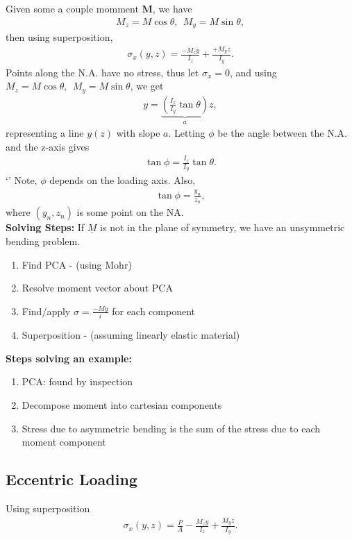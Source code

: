 \documentclass{article}
\numberwithin{equation}{subsection}
\newcommand{\bb}[1]{\mathbf{#1}}
\begin{document}
Given some a couple momment $\bb{M}$, we have
\begin{align*}
  M_z = M\cos\theta,~~ M_y = M\sin\theta,
\end{align*}
then using superposition,
\begin{align*}
  \sigma_x(y,z) = \frac{-M_z y}{I_z} + \frac{+M_y z}{I_y}.
\end{align*}
Points along the N.A. have no stress, thus let $\sigma_x = 0$, and using
$M_z = M\cos\theta,~~ M_y = M\sin\theta$, we get
\begin{align*}
  y = \underbrace{\left(\frac{I_z}{I_y}\tan\theta\right)}_a z,
\end{align*}
representing a line $y(z)$ with slope $a$.
Letting $\phi$ be the angle between the N.A. and the z-axis gives
\begin{align*}
  \tan\phi = \frac{I_z}{I_y}\tan\theta.
\end{align*}`'
Note, $\phi$ depends on the loading axis. Also,
\begin{align*}
  \tan\phi = \frac{y_n}{z_n},
\end{align*}
where $(y_n, z_n)$ is some point on the NA.
\\

\textbf{Solving Steps:}
If ${\underline{M}}$ is not in the plane of symmetry, we have an unsymmetric bending problem.
\begin{enumerate}
  \item Find PCA - (using Mohr)
  \item Resolve moment vector about PCA
  \item Find/apply $\sigma = \frac{-My}{i}$ for each component
  \item Superposition - (assuming linearly elastic material)
\end{enumerate}

\textbf{Steps solving an example:}
\begin{enumerate}
  \item PCA: found by inspection
  \item Decompose moment into cartesian components
  \item Stress due to asymmetric bending is the sum of the stress due to each moment component
\end{enumerate}

\subsection{Eccentric Loading}
Using superposition
\begin{align*}
  \sigma_x(y,z) = \frac{P}{A} - \frac{M_z y}{I_z} + \frac{M_y z}{I_y}.
\end{align*}
\end{document}

